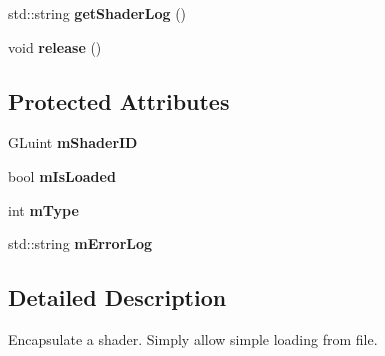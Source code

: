 \begin{DoxyCompactItemize}
\item 
\hypertarget{classde_1_1data_1_1_shader_a0aa3bd18b99a59922dde3ed539d70719}{
std\-::string {\bfseries get\-Shader\-Log} ()}
\label{classde_1_1data_1_1_shader_a0aa3bd18b99a59922dde3ed539d70719}

\item 
\hypertarget{classde_1_1data_1_1_shader_a87def2b6856bbdafa39133cd9cfeb84a}{
void {\bfseries release} ()}
\label{classde_1_1data_1_1_shader_a87def2b6856bbdafa39133cd9cfeb84a}

\end{DoxyCompactItemize}
\subsection*{\-Protected \-Attributes}
\begin{DoxyCompactItemize}
\item 
\hypertarget{classde_1_1data_1_1_shader_a2622c4d3beeaa142cfddbbea08da5567}{
\-G\-Luint {\bfseries m\-Shader\-I\-D}}
\label{classde_1_1data_1_1_shader_a2622c4d3beeaa142cfddbbea08da5567}

\item 
\hypertarget{classde_1_1data_1_1_shader_a11d7c64ba107f21279fc868ebf4277c3}{
bool {\bfseries m\-Is\-Loaded}}
\label{classde_1_1data_1_1_shader_a11d7c64ba107f21279fc868ebf4277c3}

\item 
\hypertarget{classde_1_1data_1_1_shader_a31b88cfe272c86cc17b49db1025aea8b}{
int {\bfseries m\-Type}}
\label{classde_1_1data_1_1_shader_a31b88cfe272c86cc17b49db1025aea8b}

\item 
\hypertarget{classde_1_1data_1_1_shader_a7b9400f1726f29f0be7edabde69bd611}{
std\-::string {\bfseries m\-Error\-Log}}
\label{classde_1_1data_1_1_shader_a7b9400f1726f29f0be7edabde69bd611}

\end{DoxyCompactItemize}


\subsection{\-Detailed \-Description}
\-Encapsulate a shader. \-Simply allow simple loading from file. 

